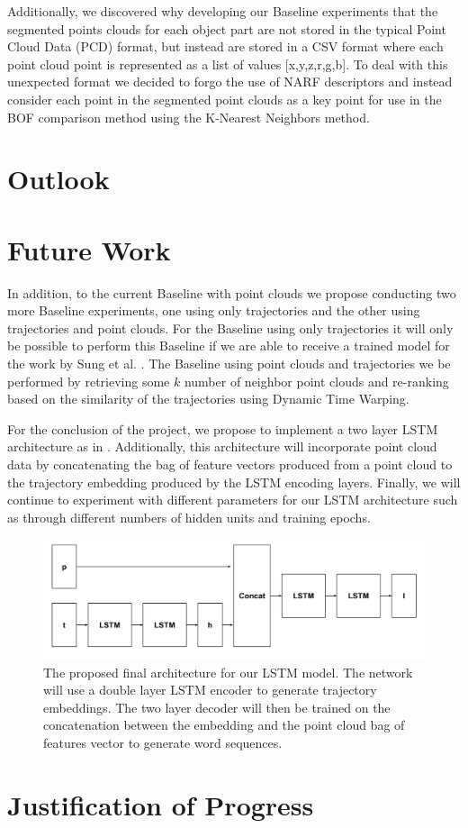 \documentclass[letterpaper, 12 pt, conference]{ieeeconf}
\begin{document}
Additionally, we discovered why developing our Baseline experiments that the segmented points clouds for each object part are not stored in the typical Point Cloud Data (PCD) format, but instead are stored in a CSV format where each point cloud point is represented as a list of values [x,y,z,r,g,b]. To deal with this unexpected format we decided to forgo the use of NARF \cite{steder2010narf} descriptors and instead consider each point in the segmented point clouds as a key point for use in the BOF comparison method using the K-Nearest Neighbors method. 

\section{Outlook}

\section{Future Work}

In addition, to the current Baseline with point clouds we propose conducting two more Baseline experiments, one using only trajectories and the other using trajectories and point clouds. For the Baseline using only trajectories it will only be possible to perform this Baseline if we are able to receive a trained model for the work by Sung et al. \cite{sung2016robobarista}. The Baseline using point clouds and trajectories we be performed by retrieving some $k$ number of neighbor point clouds and re-ranking based on the similarity of the trajectories using Dynamic Time Warping.

For the conclusion of the project, we propose to implement a two layer LSTM architecture as in \cite{Venugopalan_2015_ICCV}. Additionally, this architecture will incorporate point cloud data by concatenating the bag of feature vectors produced from a point cloud to the trajectory embedding produced by the LSTM encoding layers. Finally, we will continue to experiment with different parameters for our LSTM architecture such as through different numbers of hidden units and training epochs. 

\begin{figure}[h]
\centering
\includegraphics[scale=0.15]{Tuple_LSTM}
\caption{The proposed final architecture for our LSTM model. The network will use a double layer LSTM encoder to generate trajectory embeddings. The two layer decoder will then be trained on the concatenation between the embedding and the point cloud bag of features vector to generate word sequences.}
\end{figure}

\section{Justification of Progress}


%


\end{document}
